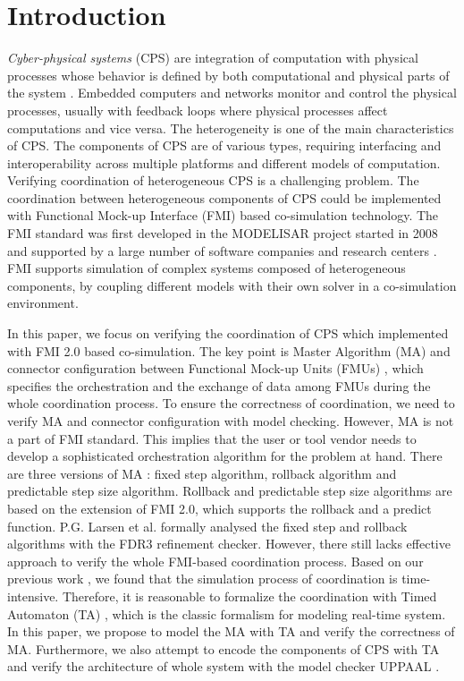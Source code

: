 \section{Introduction}

\textit{Cyber-physical systems} (CPS) are integration of computation with physical processes whose behavior is defined by both computational and physical parts of the system \cite{Zanero17}. Embedded computers and networks monitor and control the physical processes, usually with feedback loops where physical processes affect computations and vice versa. The heterogeneity is one of the main characteristics of CPS. The components of CPS are of various types, requiring interfacing and interoperability across multiple platforms and different models of computation. Verifying coordination of heterogeneous CPS is a challenging problem. The coordination between heterogeneous components of CPS could be implemented with Functional Mock-up Interface (FMI) based co-simulation technology. The FMI standard was first developed in the MODELISAR project started in 2008 and supported by a large number of software companies and research centers \cite{ClauMODELISAR}. FMI supports simulation of complex systems composed of heterogeneous components, by coupling different models with their own solver in a co-simulation environment.

In this paper, we focus on verifying the coordination of CPS which implemented with FMI 2.0 \cite{Cremona2006Automatic} based co-simulation. The key point is Master Algorithm (MA) \cite{AckerDVM15} and connector configuration between Functional Mock-up Units (FMUs) \cite{Tripakis15}, which specifies the orchestration and the exchange of data among FMUs during the whole coordination process. To ensure the correctness of coordination, we need to verify MA and connector configuration with model checking. However, MA is not a part of FMI standard. This implies that the user or tool vendor needs to develop a sophisticated orchestration algorithm for the problem at hand. 
There are three versions of MA \cite{BromanBGLMTW13}: fixed step algorithm, rollback algorithm and predictable step size algorithm. Rollback and predictable step size algorithms are based on the extension of FMI 2.0, which supports the rollback and a predict function. P.G. Larsen et al. \cite{Larsen2016Integrated} formally analysed the fixed step and rollback algorithms with the FDR3 refinement checker. However, there still lacks effective approach to verify the whole FMI-based coordination process. Based on our previous work \cite{LiuJWCD16}, we found that the simulation process of coordination is time-intensive. Therefore, it is reasonable to formalize the coordination with Timed Automaton (TA) \cite{BehrmannDLHPYH06}, which is the classic formalism for modeling real-time system. 
In this paper, we propose to model the MA with TA and verify the correctness of MA. Furthermore, we also attempt to encode the components of CPS with TA and verify the architecture of whole system with the model checker UPPAAL \cite{BehrmannDLHPYH06}. 

